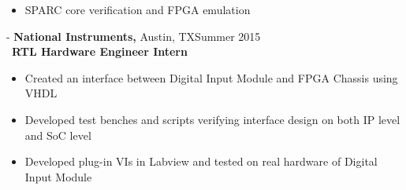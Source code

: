 \documentclass[11pt]{res}
\begin{document}
\begin{resume}
 \begin{itemize}[leftmargin=-0.1in]
   
  \item SPARC core verification and FPGA emulation \vspace{-5pt}
   \end{itemize}

\vspace{-10pt}

 -\sectionwidth \resumewidth
{\textbf{National Instruments,}  Austin, TX\hfill Summer 2015} \hspace{-0.58in}\vspace{-0mm}\\\
  \textbf{RTL Hardware Engineer Intern} \\
 \vspace{-14pt}

 \begin{itemize}[leftmargin=-0.1in]
   
  \item Created an interface between Digital Input Module and FPGA Chassis using VHDL\vspace{-5pt}
  \item Developed test benches and scripts verifying interface design on both IP level and SoC level \vspace{-5pt}
  \item Developed plug-in VIs in Labview and tested on real hardware of Digital Input Module\\
   \end{itemize}\vspace{-28pt}
   
   

\end{resume}
\end{document}
